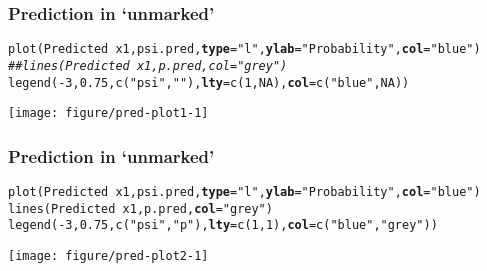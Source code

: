 \documentclass[color=usenames,dvipsnames]{beamer}\usepackage[]{graphicx}\usepackage[]{color}
\makeatletter
\newcommand{\hlnum}[1]{\textcolor[rgb]{0.69,0.494,0}{#1}}%
\newcommand{\hlstr}[1]{\textcolor[rgb]{0.749,0.012,0.012}{#1}}%
\newcommand{\hlcom}[1]{\textcolor[rgb]{0.514,0.506,0.514}{\textit{#1}}}%
\newcommand{\hlopt}[1]{\textcolor[rgb]{0,0,0}{#1}}%
\newcommand{\hlstd}[1]{\textcolor[rgb]{0,0,0}{#1}}%
\newcommand{\hlkwc}[1]{\textcolor[rgb]{0,0,0}{\textbf{#1}}}%
\newcommand{\hlkwd}[1]{\textcolor[rgb]{0.004,0.004,0.506}{#1}}%
\newenvironment{kframe}{%
 \def\at@end@of@kframe{}%
 \ifinner\ifhmode%
  \def\at@end@of@kframe{\end{minipage}}%
  \begin{minipage}{\columnwidth}%
 \fi\fi%
 \def\FrameCommand##1{\hskip\@totalleftmargin \hskip-\fboxsep
 \colorbox{shadecolor}{##1}\hskip-\fboxsep
     \hskip-\linewidth \hskip-\@totalleftmargin \hskip\columnwidth}%
 \MakeFramed {\advance\hsize-\width
   \@totalleftmargin\z@ \linewidth\hsize
   \@setminipage}}%
 {\par\unskip\endMakeFramed%
 \at@end@of@kframe}
\newenvironment{knitrout}{}{} %
\makeatother
\begin{document}
\begin{frame}[fragile]
  \frametitle{Prediction in `unmarked'}
\begin{knitrout}\scriptsize
{}\color{fgcolor}\begin{kframe}
\begin{alltt}
\hlkwd{plot}\hlstd{(Predicted} \hlopt{~} \hlstd{x1, psi.pred,} \hlkwc{type}\hlstd{=}\hlstr{"l"}\hlstd{,} \hlkwc{ylab}\hlstd{=}\hlstr{"Probability"}\hlstd{,} \hlkwc{col}\hlstd{=}\hlstr{"blue"}\hlstd{)}
\hlcom{## lines(Predicted ~ x1, p.pred, col="grey")}
\hlkwd{legend}\hlstd{(}\hlopt{-}\hlnum{3}\hlstd{,} \hlnum{0.75}\hlstd{,} \hlkwd{c}\hlstd{(}\hlstr{"psi"}\hlstd{,} \hlstr{""}\hlstd{),} \hlkwc{lty}\hlstd{=}\hlkwd{c}\hlstd{(}\hlnum{1}\hlstd{,} \hlnum{NA}\hlstd{),} \hlkwc{col}\hlstd{=}\hlkwd{c}\hlstd{(}\hlstr{"blue"}\hlstd{,} \hlnum{NA}\hlstd{))}
\end{alltt}
\end{kframe}

{\centering \texttt{[image: figure/pred-plot1-1]} 

}



\end{knitrout}
\end{frame}


\begin{frame}[fragile]
  \frametitle{Prediction in `unmarked'}
\begin{knitrout}\scriptsize
{}\color{fgcolor}\begin{kframe}
\begin{alltt}
\hlkwd{plot}\hlstd{(Predicted} \hlopt{~} \hlstd{x1, psi.pred,} \hlkwc{type}\hlstd{=}\hlstr{"l"}\hlstd{,} \hlkwc{ylab}\hlstd{=}\hlstr{"Probability"}\hlstd{,} \hlkwc{col}\hlstd{=}\hlstr{"blue"}\hlstd{)}
\hlkwd{lines}\hlstd{(Predicted} \hlopt{~} \hlstd{x1, p.pred,} \hlkwc{col}\hlstd{=}\hlstr{"grey"}\hlstd{)}
\hlkwd{legend}\hlstd{(}\hlopt{-}\hlnum{3}\hlstd{,} \hlnum{0.75}\hlstd{,} \hlkwd{c}\hlstd{(}\hlstr{"psi"}\hlstd{,} \hlstr{"p"}\hlstd{),} \hlkwc{lty}\hlstd{=}\hlkwd{c}\hlstd{(}\hlnum{1}\hlstd{,} \hlnum{1}\hlstd{),} \hlkwc{col}\hlstd{=}\hlkwd{c}\hlstd{(}\hlstr{"blue"}\hlstd{,} \hlstr{"grey"}\hlstd{))}
\end{alltt}
\end{kframe}

{\centering \texttt{[image: figure/pred-plot2-1]} 

}



\end{knitrout}
\end{frame}
\end{document}
